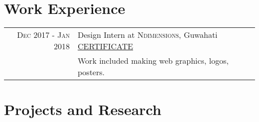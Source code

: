 \documentclass[a4paper,5pt]{article}
\begin{document}
\section{Work Experience}
\begin{tabular}{r|p{11cm}}
 \textsc{Dec 2017 - Jan 2018} &  Design Intern at \textsc{Ndimensions}, Guwahati \footnotesize{\href{https://drive.google.com/open?id=1Msnd6OmNwTnTXd-VSazmc9ETyv-g6dd4}{CERTIFICATE}}\\
 &\footnotesize{ Work included making web graphics, logos, posters. }\\

\end{tabular}

\section{Projects and Research}
\end{document}
